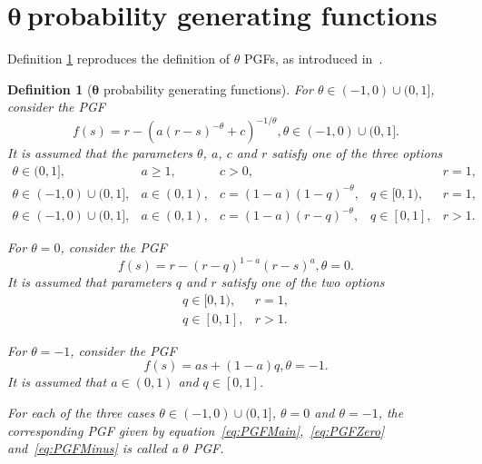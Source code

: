 \documentclass[final, 12pt]{colt2021} %
\newtheorem{dfn}{Definition}
\begin{document}


% 


\appendix

\section{\texorpdfstring{$\boldsymbol{\theta}~$} pprobability generating functions}
\label{sec:theta_pgfs}

Definition \ref{dfn:theta_pgfs} reproduces the definition of
$\theta$ PGFs, as introduced in~\citet{sagitov2016}.

\begin{dfn}[$\boldsymbol{\theta}$ probability generating functions]
\label{dfn:theta_pgfs}
For $\theta \in (-1, 0) \cup (0, 1]$, consider
the PGF
\begin{equation}\label{eq:PGFMain}
f(s) =
r-(a(r-s)^{-\theta}+c)^{-1/\theta}, \theta\in (-1, 0) \cup (0, 1] .
\end{equation}
It is assumed that the parameters $\theta$, $a$, $c$ and $r$
satisfy one of the three options
\begin{equation*}
\begin{array}{llllll}
\theta\in(0,1], & a\ge1,  & c>0, & & r=1,\\
\theta \in (-1, 0) \cup (0, 1], & a\in(0,1),&  c=(1-a) (1-q)^{-\theta}, &q\in[0,1), & r=1,\\
\theta \in (-1, 0) \cup (0, 1], & a\in(0,1),&  c=(1-a) (r-q)^{-\theta}, &q\in[0,1], & r>1.
\end{array}
\end{equation*}

For $\theta=0$, consider the PGF
\begin{equation}\label{eq:PGFZero}
f(s) =
r-(r-q)^{1-a}(r-s)^{a}, \theta = 0.
\end{equation}
It is assumed that parameters $q$ and $r$ satisfy one of the two options
\begin{equation*}
\begin{array}{ll}
q \in [0, 1), & r = 1, \\
q \in [0, 1], & r > 1.
\end{array}
\end{equation*}

For $\theta=-1$, consider the PGF
\begin{equation}\label{eq:PGFMinus}
f(s) =
as+(1-a)q, \theta = - 1 .
\end{equation}
It is assumed that $a \in (0, 1)$ and $q \in [0, 1]$.

For each of the three cases
$\theta \in (-1, 0) \cup (0, 1]$,
$\theta=0$ and $\theta=-1$,
the corresponding PGF given by
equation~\eqref{eq:PGFMain},~\eqref{eq:PGFZero} and~\eqref{eq:PGFMinus}
is called a $\theta$ PGF.

\end{dfn}
\end{document}
